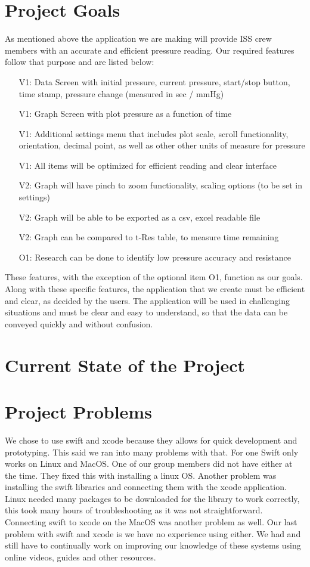 \documentclass[onecolumn, draftclsnofoot,10pt, compsoc]{IEEEtran}
\begin{document}
\section{Project Goals}
As mentioned above the application we are making will provide ISS crew members with an accurate and efficient pressure reading.
Our required features follow that purpose and are listed below:
\begin{itemize}
\item[V1:] Data Screen with initial pressure, current pressure, start/stop button, time stamp, pressure change (measured in sec / mmHg)
\item[V1:] Graph Screen with plot pressure as a function of time
\item[V1:] Additional settings menu that includes plot scale, scroll functionality, orientation, decimal point, as well as other other units of measure for pressure
\item[V1:] All items will be optimized for efficient reading and clear interface
\item[V2:] Graph will have pinch to zoom functionality, scaling options (to be set in settings)
\item[V2:] Graph will be able to be exported as a csv, excel readable file
\item[V2:] Graph can be compared to t-Res table, to measure time remaining
\item[O1:] Research can be done to identify low pressure accuracy and resistance
\end{itemize}
These features, with the exception of the optional item O1, function as our goals.
Along with these specific features, the application that we create must be efficient and clear, as decided by the users.
The application will be used in challenging situations and must be clear and easy to understand, so that the data can be conveyed quickly and without confusion.

\section{Current State of the Project}

\section{Project Problems}
We chose to use swift and xcode because they allows for quick development and prototyping.
This said we ran into many problems with that. For one Swift only works on Linux and MacOS.
One of our group members did not have either at the time. They fixed this with installing a linux OS.
Another problem was installing the swift libraries and connecting them with the xcode application.
Linux needed many packages to be downloaded for the library to work correctly, this took many hours of troubleshooting as it was not straightforward.
Connecting swift to xcode on the MacOS was another problem as well.
Our last problem with swift and xcode is we have no experience using either.
We had and still have to continually work on improving our knowledge of these systems using online videos, guides and other resources.
\end{document}
